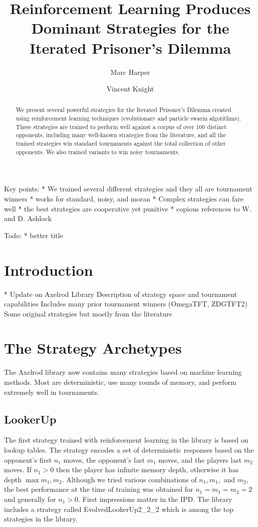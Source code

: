 \documentclass{article}
\title{Reinforcement Learning Produces Dominant Strategies for the
Iterated Prisoner's Dilemma}
\author{Marc Harper \and Vincent Knight} %
\date{}
\begin{document}
\maketitle

Key points:
* We trained several different strategies and they all are tournament
winners
* works for standard, noisy, and moran
* Complex strategies can fare well
* the best strategies are cooperative yet punitive
* copious references to W. and D. Ashlock

Todo:
* better title


\begin{abstract}
    We present several powerful strategies for the Iterated
    Prisoner's Dilemma created using reinforcement learning techniques
    (evolutionary and particle swarm algorithms). These strategies are
    trained to perform well against a corpus of over 100 distinct
    opponents, including many well-known strategies from the literature, and all
    the trained strategies win standard tournaments against the total collection
    of other opponents. We also trained variants to win noisy tournaments.
\end{abstract} 

\section{Introduction}\label{sec:introduction}

* Update on Axelrod Library
Description of strategy space and tournament capabilities
Includes many prior tournament winners (OmegaTFT, ZDGTFT2)
Some original strategies but mostly from the literature


\section{The Strategy Archetypes}

The Axelrod library now contains many strategies based on machine learning
methods. Most are deterministic, use many rounds of memory, and perform
extremely well in tournaments.

\subsection{LookerUp}

The first strategy trained with reinforcement learning in the library is based
on lookup tables. The strategy encodes a set of deterministic responses
based on the opponent's first $n_1$ moves, the opponent's last $m_1$ moves, and
the players last $m_2$ moves. If $n_1 > 0$ then the player has infinite memory
depth, otherwise it has depth $\max{m_1, m_2}$. Although we tried various
combinations of $n_1, m_1,$ and $m_2$, the best performance at the time of
training was obtained for $n_1 = m_1 = m_2 = 2$ and generally for $n_1 > 0$. 
First impressions matter in the IPD. The library includes a strategy
called EvolvedLookerUp2_2_2 which is among the top strategies in the library.
\end{document}
